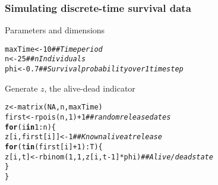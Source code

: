 \documentclass[color=usenames,dvipsnames]{beamer}\usepackage[]{graphicx}\usepackage[]{color}
\makeatletter
\newcommand{\hlnum}[1]{\textcolor[rgb]{0.69,0.494,0}{#1}}%
\newcommand{\hlcom}[1]{\textcolor[rgb]{0.514,0.506,0.514}{\textit{#1}}}%
\newcommand{\hlopt}[1]{\textcolor[rgb]{0,0,0}{#1}}%
\newcommand{\hlstd}[1]{\textcolor[rgb]{0,0,0}{#1}}%
\newcommand{\hlkwa}[1]{\textcolor[rgb]{0,0,0}{\textbf{#1}}}%
\newcommand{\hlkwb}[1]{\textcolor[rgb]{0,0.341,0.682}{#1}}%
\newcommand{\hlkwd}[1]{\textcolor[rgb]{0.004,0.004,0.506}{#1}}%
\newenvironment{kframe}{%
 \def\at@end@of@kframe{}%
 \ifinner\ifhmode%
  \def\at@end@of@kframe{\end{minipage}}%
  \begin{minipage}{\columnwidth}%
 \fi\fi%
 \def\FrameCommand##1{\hskip\@totalleftmargin \hskip-\fboxsep
 \colorbox{shadecolor}{##1}\hskip-\fboxsep
     \hskip-\linewidth \hskip-\@totalleftmargin \hskip\columnwidth}%
 \MakeFramed {\advance\hsize-\width
   \@totalleftmargin\z@ \linewidth\hsize
   \@setminipage}}%
 {\par\unskip\endMakeFramed%
 \at@end@of@kframe}
\newenvironment{knitrout}{}{} %
\makeatother
\begin{document}





\begin{frame}[fragile]
  \frametitle{Simulating discrete-time survival data}
  {%
    Parameters and dimensions}
\begin{knitrout}\footnotesize
{}\color{fgcolor}\begin{kframe}
\begin{alltt}
\hlstd{maxTime} \hlkwb{<-} \hlnum{10}           \hlcom{## Time period}
\hlstd{n} \hlkwb{<-} \hlnum{25}                 \hlcom{## nIndividuals}
\hlstd{phi} \hlkwb{<-} \hlnum{0.7}              \hlcom{## Survival probability over 1 time step}
\end{alltt}
\end{kframe}
\end{knitrout}
\pause
\vfill
{%
  Generate $z$, the alive-dead indicator}
\begin{knitrout}\footnotesize
{}\color{fgcolor}\begin{kframe}
\begin{alltt}
\hlstd{z} \hlkwb{<-} \hlkwd{matrix}\hlstd{(}\hlnum{NA}\hlstd{, n, maxTime)}
\hlstd{first} \hlkwb{<-} \hlkwd{rpois}\hlstd{(n,} \hlnum{1}\hlstd{)}\hlopt{+}\hlnum{1}  \hlcom{## random release dates}
\hlkwa{for}\hlstd{(i} \hlkwa{in} \hlnum{1}\hlopt{:}\hlstd{n) \{}
    \hlstd{z[i,first[i]]} \hlkwb{<-} \hlnum{1}  \hlcom{## Known alive at release}
    \hlkwa{for}\hlstd{(t} \hlkwa{in} \hlstd{(first[i]}\hlopt{+}\hlnum{1}\hlstd{)}\hlopt{:}\hlstd{T) \{}
        \hlstd{z[i,t]} \hlkwb{<-} \hlkwd{rbinom}\hlstd{(}\hlnum{1}\hlstd{,} \hlnum{1}\hlstd{, z[i,t}\hlopt{-}\hlnum{1}\hlstd{]}\hlopt{*}\hlstd{phi)} \hlcom{## Alive/dead state}
    \hlstd{\}}
\hlstd{\}}
\end{alltt}
\end{kframe}
\end{knitrout}
\end{frame}
\end{document}

